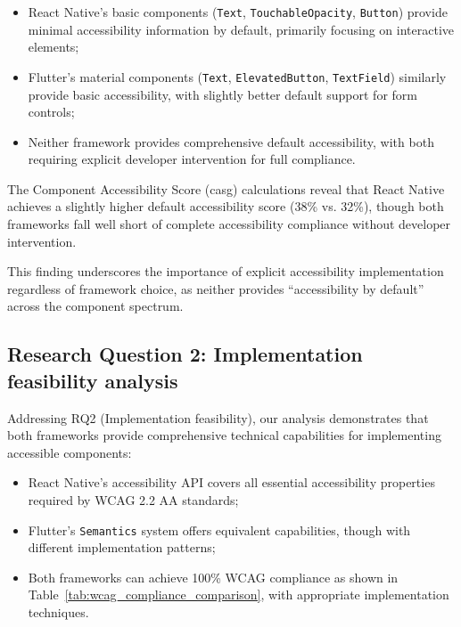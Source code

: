 \begin{itemize}
    \item React Native's basic components (\texttt{Text}, \texttt{TouchableOpacity}, \texttt{Button}) provide minimal accessibility information by default, primarily focusing on interactive elements;
    
    \item Flutter's material components (\texttt{Text}, \texttt{ElevatedButton}, \texttt{TextField}) similarly provide basic accessibility, with slightly better default support for form controls;
    
    \item Neither framework provides comprehensive default accessibility, with both requiring explicit developer intervention for full compliance.
\end{itemize}

The Component Accessibility Score (\gls{casg}) calculations reveal that React Native achieves a slightly higher default accessibility score (38\% vs. 32\%), though both frameworks fall well short of complete accessibility compliance without developer intervention.

This finding underscores the importance of explicit accessibility implementation regardless of framework choice, as neither provides ``accessibility by default'' across the component spectrum.

\subsection{Research Question 2: Implementation feasibility analysis}
\label{subsec:implementation-feasibility}

Addressing RQ2 (Implementation feasibility), our analysis demonstrates that both frameworks provide comprehensive technical capabilities for implementing accessible components:

\begin{itemize}
    \item React Native's accessibility API covers all essential accessibility properties required by WCAG 2.2 AA standards;
    
    \item Flutter's \texttt{Semantics} system offers equivalent capabilities, though with different implementation patterns;
    
    \item Both frameworks can achieve 100\% WCAG compliance as shown in Table~\ref{tab:wcag_compliance_comparison}, with appropriate implementation techniques.
\end{itemize}

